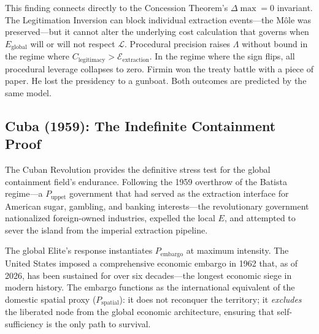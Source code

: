 This finding connects directly to the Concession Theorem's $\Delta\max = 0$ invariant. The Legitimation Inversion can block individual extraction events---the Môle was preserved---but it cannot alter the underlying cost calculation that governs when $E_{\text{global}}$ will or will not respect $\mathcal{L}$. Procedural precision raises $\Lambda$ without bound in the regime where $C_{\text{legitimacy}} > \mathcal{E}_{\text{extraction}}$. In the regime where the sign flips, all procedural leverage collapses to zero. Firmin won the treaty battle with a piece of paper. He lost the presidency to a gunboat. Both outcomes are predicted by the same model.

\subsection{Cuba (1959): The Indefinite Containment Proof}

The Cuban Revolution provides the definitive stress test for the global containment field's endurance. Following the 1959 overthrow of the Batista regime---a $P_{\text{uppet}}$ government that had served as the extraction interface for American sugar, gambling, and banking interests---the revolutionary government nationalized foreign-owned industries, expelled the local $E$, and attempted to sever the island from the imperial extraction pipeline.

The global Elite's response instantiates $P_{\text{embargo}}$ at maximum intensity. The United States imposed a comprehensive economic embargo in 1962 that, as of 2026, has been sustained for over six decades---the longest economic siege in modern history. The embargo functions as the international equivalent of the domestic spatial proxy ($P_{\text{spatial}}$): it does not reconquer the territory; it \textit{excludes} the liberated node from the global economic architecture, ensuring that self-sufficiency is the only path to survival.

